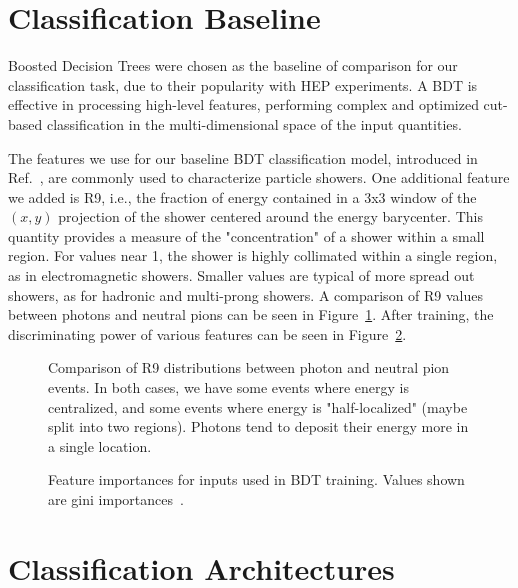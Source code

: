 \section{Classification Baseline}\label{app:BDT}

Boosted Decision Trees were chosen as the baseline of comparison for our classification task, due to their popularity with HEP experiments. A BDT is effective in processing high-level features, performing complex and optimized cut-based classification in the multi-dimensional space of the input quantities. 


The features we use for our baseline BDT classification model, introduced in Ref.~\cite{NIPS}, are commonly used to characterize particle showers. One additional feature we added is R9, i.e., the fraction of energy contained in a 3x3 window of the $(x,y)$ projection of the shower centered around the energy barycenter. This quantity provides a measure of the "concentration" of a shower within a small region. For values near 1, the shower is highly collimated within a single region, as in electromagnetic showers. Smaller values are typical of more spread out showers, as for hadronic and multi-prong showers. A comparison of R9 values between photons and neutral pions can be seen in Figure~\ref{fig:R9}. After training, the discriminating power of various features can be seen in Figure~\ref{fig:BDT_ranking}.

\begin{figure}[htbp]
\centering
\caption{Comparison of R9 distributions between photon and neutral pion events. In both cases, we have some events where energy is centralized, and some events where energy is "half-localized" (maybe split into two regions). Photons tend to deposit their energy more in a single location.
\label{fig:R9}}
\end{figure}

\begin{figure}[htbp]
\centering
\caption{Feature importances for inputs used in BDT training. Values shown are gini importances~\cite{Breiman}.\label{fig:BDT_ranking}}
\end{figure}

\section{Classification Architectures}

